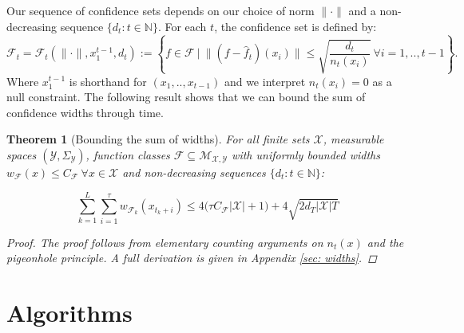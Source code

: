 \documentclass{article}
\newtheorem{theorem}{Theorem}
\newcommand{\Nat}{\mathbb{N}}
\newcommand{\Xc}{\mathcal{X}}
\newcommand{\Yc}{\mathcal{Y}}
\newcommand{\Fc}{\mathcal{F}}
\newcommand{\Mc}{\mathcal{M}}
\begin{document}
Our sequence of confidence sets depends on our choice of norm $\| \cdot \|$ and a non-decreasing sequence $\{d_t : t \in \Nat\}$.
For each $t$, the confidence set is defined by:
$$\Fc_t = \Fc_t ( \| \cdot \|, x^{t-1}_1 , d_t):= \left\{f \in \Fc \ \bigg\vert \ \|(f - \hat{f}_t)(x_i)\| \leq \sqrt{\frac{d_t}{n_t(x_i)}} \ \forall i=1,..,t-1 \right\}.$$
Where $x^{t-1}_1$ is shorthand for $(x_1, .. ,x_{t-1})$ and we interpret $n_t(x_i) = 0$ as a null constraint.
The following result shows that we can bound the sum of confidence widths through time.


\begin{theorem}[Bounding the sum of widths]
\label{thm: widths} \hspace{0.000000001mm} \newline
For all finite sets $\Xc$, measurable spaces $(\Yc,\Sigma_{\Yc})$, function classes $\Fc \subseteq \Mc_{\Xc,\Yc}$ with uniformly bounded widths $w_\Fc(x) \le C_\Fc \ \forall x \in \Xc$ and non-decreasing sequences $\{d_t : t \in \Nat \}$:

\begin{equation}
	\sum_{k=1}^L \sum_{i=1}^\tau w_{\mathcal{F}_{k}}(x_{t_k+i})
	\le  4 \big(\tau C_\Fc | \Xc | + 1\big) + 4 \sqrt{2d_T | \Xc | T}
\end{equation}

\begin{proof}
The proof follows from elementary counting arguments on $n_t(x)$ and the pigeonhole principle.
A full derivation is given in Appendix \ref{sec: widths}.
\end{proof}
\end{theorem}




\section{Algorithms}
\label{sec: algos}
\end{document}
